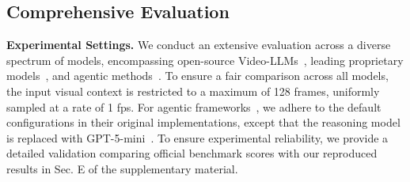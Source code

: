 \documentclass[runningheads]{llncs}
\begin{document}
{    \subsection{Comprehensive Evaluation}
    \label{sec:4.2}
        \noindent \textbf{Experimental Settings.} 
        We conduct an extensive evaluation across a diverse spectrum of models, encompassing open-source Video-LLMs~\cite{qwem3_vl,eagle25,videoautor1,videor1}, leading proprietary models~\cite{gpt4o,gemini25}, and agentic methods~\cite{videotool,videotree}.
        To ensure a fair comparison across all models, the input visual context is restricted to a maximum of 128 frames, uniformly sampled at a rate of 1 fps.
        For agentic frameworks~\cite{videotree,videotool}, we adhere to the default configurations in their original implementations, except that the reasoning model is replaced with GPT-5-mini~\cite{gpt5}.
        To ensure experimental reliability, we provide a detailed validation comparing official benchmark scores with our reproduced results in Sec. E of the supplementary material.

}
\end{document}
